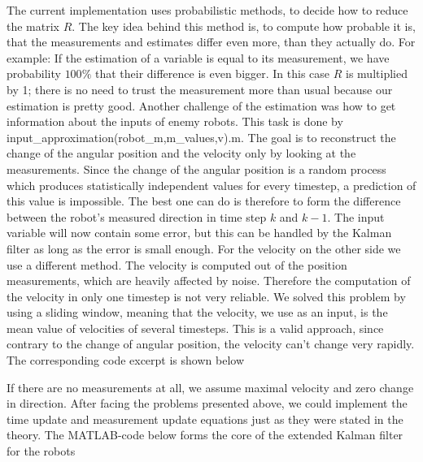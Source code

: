 

The current implementation uses probabilistic methods, to decide how to reduce the matrix \(R\). The key idea behind this method is, to compute how probable it is, that the measurements and estimates differ even more, than they actually do. For example: If the estimation of a variable is equal to its measurement, we have probability \(100\%\) that their difference is even bigger. In this case \(R\) is multiplied by 1; there is no need to trust the measurement more than usual because our estimation is pretty good.
Another challenge of the estimation was how to get information about the inputs of enemy robots. This task is done by {\selectfont input\_approximation(robot\_m,m\_values,v).m}. The goal is to reconstruct the change of the angular position and the velocity only by looking at the measurements. Since the change of the angular position is a random process which produces statistically independent values for every timestep, a prediction of this value is impossible. The best one can do is therefore to form the difference between the robot's measured direction in time step \(k\) and \(k-1\). The input variable will now contain some error, but this can be handled by the Kalman filter as long as the error is small enough. For the velocity on the other side we use a different method. The velocity is computed out of the position measurements, which are heavily affected by noise. Therefore the computation of the velocity in only one timestep is not very reliable. We solved this problem by using a sliding window, meaning that the velocity, we use as an input, is the mean value of velocities of several timesteps. This is a valid approach, since contrary to the change of angular position, the velocity can't change very rapidly. The corresponding code excerpt is shown below



If there are no measurements at all, we assume maximal velocity and zero change in direction.
After facing the problems presented above, we could implement the time update and measurement update equations just as they were stated in the theory. The MATLAB-code below forms the core of the extended Kalman filter for the robots


\parskip 20pt

